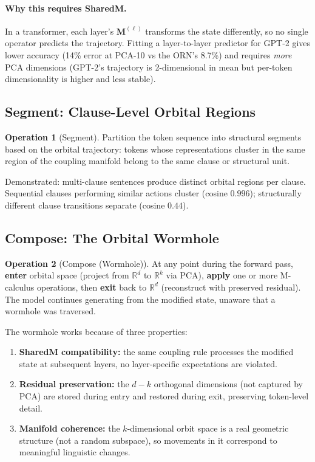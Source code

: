\documentclass[11pt, a4paper]{article}
\newcommand{\M}{\mathbf{M}}
\newcommand{\R}{\mathbb{R}}
\theoremstyle{plain}
\theoremstyle{definition}
\newtheorem{operation}{Operation}
\theoremstyle{remark}
\begin{document}
\paragraph{Why this requires SharedM.}
In a transformer, each layer's $\M^{(\ell)}$ transforms the state differently, so no single operator predicts the trajectory.
Fitting a layer-to-layer predictor for GPT-2 gives lower accuracy (14\% error at PCA-10 vs the ORN's 8.7\%) and requires \emph{more} PCA dimensions (GPT-2's trajectory is 2-dimensional in mean but per-token dimensionality is higher and less stable).

\subsection{Segment: Clause-Level Orbital Regions}

\begin{operation}[Segment]
Partition the token sequence into structural segments based on the orbital trajectory: tokens whose representations cluster in the same region of the coupling manifold belong to the same clause or structural unit.
\end{operation}

Demonstrated: multi-clause sentences produce distinct orbital regions per clause.
Sequential clauses performing similar actions cluster (cosine $0.996$); structurally different clause transitions separate (cosine $0.44$).

\subsection{Compose: The Orbital Wormhole}

\begin{operation}[Compose (Wormhole)]
At any point during the forward pass, \textbf{enter} orbital space (project from $\R^d$ to $\R^k$ via PCA), \textbf{apply} one or more M-calculus operations, then \textbf{exit} back to $\R^d$ (reconstruct with preserved residual).
The model continues generating from the modified state, unaware that a wormhole was traversed.
\end{operation}

The wormhole works because of three properties:
\begin{enumerate}[nosep]
\item \textbf{SharedM compatibility:} the same coupling rule processes the modified state at subsequent layers, no layer-specific expectations are violated.
\item \textbf{Residual preservation:} the $d - k$ orthogonal dimensions (not captured by PCA) are stored during entry and restored during exit, preserving token-level detail.
\item \textbf{Manifold coherence:} the $k$-dimensional orbit space is a real geometric structure (not a random subspace), so movements in it correspond to meaningful linguistic changes.
\end{enumerate}
\end{document}
